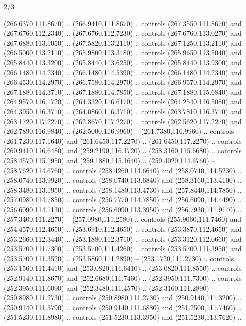 \begin{flagdescription}{2/3}
\begin{scope}[xshift=0.5\flaglength,yshift=0.5\flagwidth,scale=\flagwidth/259.2]
\begin{scope}[y=0.8pt, x=0.8pt, yscale=-1,shift={(-243,-162)}]
      (266.6370,111.8670) .. (266.9410,111.8670) .. controls (267.3550,111.8670) and
      (267.6760,112.2340) .. (267.6760,112.7230) .. controls (267.6760,113.0270) and
      (267.6880,113.1050) .. (267.5820,113.2110) .. controls (267.1250,113.2110) and
      (266.5000,113.2110) .. (265.9800,113.3480) .. controls (265.9650,113.5040) and
      (265.8440,113.3200) .. (265.8440,113.6250) .. controls (265.8440,113.9300) and
      (266.1480,114.2340) .. (266.1480,114.5390) .. controls (266.1480,114.2340) and
      (266.4530,114.2970) .. (266.7580,114.2970) .. controls (266.9570,114.2970) and
      (267.1880,114.3710) .. (267.1880,114.7850) .. controls (267.1880,115.6840) and
      (264.9570,116.1720) .. (264.3320,116.6170) .. controls (264.2540,116.5080) and
      (264.3950,116.3710) .. (264.0860,116.3710) .. controls (263.7810,116.3710) and
      (263.1720,117.2270) .. (262.8670,117.2270) .. controls (262.5620,117.2270) and
      (262.7890,116.9840) .. (262.5000,116.9960) -- (261.7380,116.9960) .. controls
      (261.7230,117.1640) and (261.6450,117.2270) .. (261.6450,117.2270) .. controls
      (260.9410,116.6480) and (259.2190,116.1720) .. (258.3160,115.6680) .. controls
      (258.4570,115.1950) and (259.1880,115.1640) .. (259.4020,114.6760) --
      (258.7620,114.6760) .. controls (258.4260,114.6640) and (258.0740,114.5230) ..
      (258.0740,113.9920) .. controls (258.0740,113.6840) and (258.3160,113.4100) ..
      (258.3480,113.1950) .. controls (258.1480,113.4730) and (257.8440,114.7850) ..
      (257.0980,114.7850) .. controls (256.7770,114.7850) and (256.6090,114.4490) ..
      (256.6090,114.1130) .. controls (256.6090,113.3950) and (256.7930,111.9140) ..
      (257.3400,111.2270) -- (257.0980,111.2580) .. controls (255.9060,111.7460) and
      (254.4570,112.4650) .. (253.6910,112.4650) .. controls (253.3870,112.4650) and
      (253.2660,112.3440) .. (253.1880,112.3710) .. controls (253.3120,112.0660) and
      (253.5700,111.7300) .. (253.5700,111.4260) .. controls (253.5700,111.3950) and
      (253.5700,111.3520) .. (253.5860,111.2890) -- (253.1720,111.2730) .. controls
      (253.1560,111.4410) and (253.0820,111.6410) .. (253.0820,111.8550) .. controls
      (252.9140,111.8670) and (252.6680,111.7460) .. (252.3950,111.7300) .. controls
      (252.3950,111.6090) and (252.3480,111.4570) .. (252.3160,111.2890) --
      (250.8980,111.2730) .. controls (250.8980,111.2730) and (250.9140,111.3200) ..
      (250.9140,111.3790) .. controls (250.9140,111.6880) and (251.2500,111.7460) ..
      (251.5230,111.8980) .. controls (251.5230,113.3950) and (251.5230,113.7620) ..

\end{scope}
\end{scope}
\end{flagdescription}
